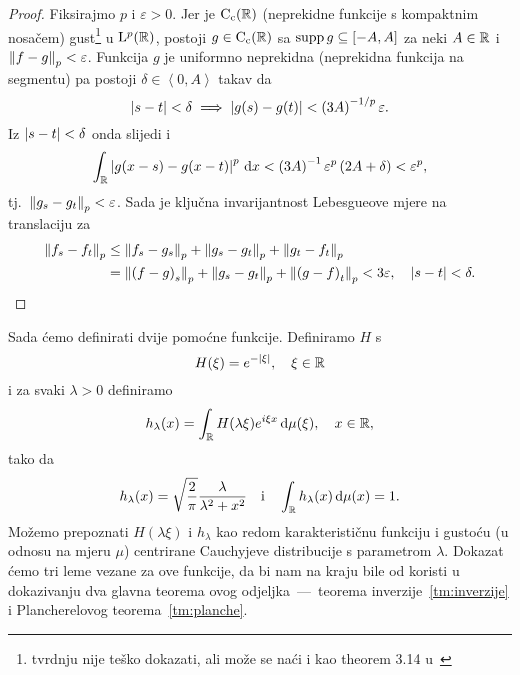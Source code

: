 \documentclass[main.tex]{subfiles}
\begin{document}
\begin{proof}
	Fiksirajmo \( p \) i \( \varepsilon > 0 \). Jer je \( \mathrm{C}_{\mathrm{c}}(\mathbb{R}) \) (neprekidne funkcije s kompaktnim nosačem)
	gust\footnote{tvrdnju nije teško dokazati, ali može se naći i kao theorem 3.14 u~\cite{rudin}} u \( \mathrm{L}^p(\mathbb{R}) \), postoji \( g \in \mathrm{C}_{\mathrm{c}}(\mathbb{R}) \) sa \( \operatorname{supp} g \subseteq \left[ -A, A \right] \)
	za neki \( A \in \mathbb{R} \) i \( \left\lVert f-g\right\rVert_p < \varepsilon \). Funkcija \( g \)
	je uniformno neprekidna (neprekidna funkcija na segmentu) pa postoji \( \delta \in \left\langle0,A\right\rangle \) takav da
	\begin{equation}
		\left| {s-t} \right| < \delta \implies \left| {g(s)-g(t)} \right| < \left( 3A \right)^{-1/p} \varepsilon.
	\end{equation}
	Iz \( \left| {s-t} \right| < \delta \) onda slijedi i
	\begin{equation}
		\int_{\mathbb{R}} \left| {g(x-s)-g(x-t)} \right|^p \,\mathrm d x < \left( 3A \right)^{-1}\varepsilon^p
		\left( 2A + \delta \right) < \varepsilon^p,
	\end{equation}
	tj.\ \( \left\lVert g_s-g_t\right\rVert_p < \varepsilon \). Sada je ključna invarijantnost
	Lebesgueove mjere na translaciju za
	\begin{equation}
		\begin{aligned}
			\left\lVert f_s-f_t\right\rVert_p & \le \left\lVert f_s-g_s\right\rVert_p + \left\lVert g_s-g_t\right\rVert_p + \left\lVert g_t-f_t\right\rVert_p                                         \\
			                 & = \left\lVert\left( f-g \right)_s\right\rVert_p + \left\lVert g_s-g_t\right\rVert_p + \left\lVert\left( g-f \right)_t\right\rVert_p < 3\varepsilon,
			\quad \left| {s-t} \right|<\delta.
		\end{aligned}
	\end{equation}
\end{proof}

Sada ćemo definirati dvije pomoćne funkcije. Definiramo \( H \) s
\begin{equation}
	H(\xi) = e^{-\left| {\xi} \right|}, \quad \xi \in \mathbb{R}
\end{equation}
i za svaki \( \lambda > 0 \) definiramo
\begin{equation}
	h_\lambda(x) = \int_{\mathbb{R}} H(\lambda \xi) e^{i\xi x} \,\mathrm d \mu(\xi), \quad x \in \mathbb{R},
\end{equation}
tako da
\begin{equation} \label{eq:hseintu1}
	h_\lambda(x) = \sqrt{\frac 2\pi} \frac \lambda{\lambda^2 + x^2}
	\quad \mathrm i \quad
	\int_{\mathbb{R}} h_\lambda(x) \,\mathrm d \mu(x) = 1.
\end{equation}
Možemo prepoznati \( H(\lambda \xi) \) i
\( h_\lambda \) kao redom karakterističnu funkciju i gustoću (u odnosu na mjeru \( \mu \))
centrirane Cauchyjeve distribucije s parametrom \( \lambda \). Dokazat ćemo tri
leme vezane za ove funkcije, da bi nam na kraju bile od koristi
u dokazivanju dva glavna teorema ovog odjeljka~---~teorema
inverzije~\ref{tm:inverzije} i Plancherelovog teorema~\ref{tm:planche}.
\end{document}
